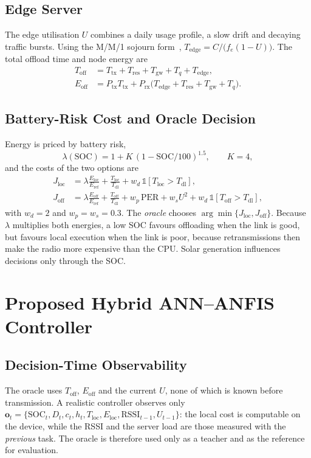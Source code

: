 \documentclass[conference]{IEEEtran}
\newcommand{\Jl}{J_{\mathrm{loc}}}
\newcommand{\Jo}{J_{\mathrm{off}}}
\begin{document}
\subsection{Edge Server}
The edge utilisation $U$ combines a daily usage profile, a slow drift and decaying traffic bursts. Using the M/M/1 sojourn
form~\cite{kleinrock1975queueing}, $T_{\mathrm{edge}} = C/\big(f_e(1-U)\big)$. The total offload time and node energy are
\begin{align}
T_{\mathrm{off}} &= T_{\mathrm{tx}} + T_{\mathrm{res}} + T_{\mathrm{gw}} + T_{q} + T_{\mathrm{edge}},\\
E_{\mathrm{off}} &= P_{\mathrm{tx}}T_{\mathrm{tx}} + P_{\mathrm{rx}}\big(T_{\mathrm{edge}}+T_{\mathrm{res}}+T_{\mathrm{gw}}+T_{q}\big).
\end{align}

\subsection{Battery-Risk Cost and Oracle Decision}
Energy is priced by battery risk,
\begin{equation}
\lambda(\mathrm{SOC}) = 1 + K\,(1-\mathrm{SOC}/100)^{1.5},\qquad K=4,
\end{equation}
and the costs of the two options are
\begin{align}
\Jl &= \lambda\frac{E_{\mathrm{loc}}}{E_{\mathrm{ref}}} + \frac{T_{\mathrm{loc}}}{T_{\mathrm{dl}}} + w_d\,\mathbb{1}[T_{\mathrm{loc}}>T_{\mathrm{dl}}],\\
\Jo &= \lambda\frac{E_{\mathrm{off}}}{E_{\mathrm{ref}}} + \frac{T_{\mathrm{off}}}{T_{\mathrm{dl}}} + w_p\,\mathrm{PER} + w_s U^2 + w_d\,\mathbb{1}[T_{\mathrm{off}}>T_{\mathrm{dl}}],
\end{align}
with $w_d=2$ and $w_p=w_s=0.3$. The \emph{oracle} chooses $\arg\min\{\Jl,\Jo\}$. Because $\lambda$ multiplies both energies, a low SOC
favours offloading when the link is good, but favours local execution when the link is poor, because retransmissions then make the
radio more expensive than the CPU. Solar generation influences decisions only through the SOC.

\section{Proposed Hybrid ANN--ANFIS Controller}
\subsection{Decision-Time Observability}
The oracle uses $T_{\mathrm{off}}$, $E_{\mathrm{off}}$ and the current $U$, none of which is known before transmission. A realistic
controller observes only
$\mathbf{o}_t=\{\mathrm{SOC}_t, D_t, c_t, h_t, T_{\mathrm{loc}}, E_{\mathrm{loc}}, \mathrm{RSSI}_{t-1}, U_{t-1}\}$:
the local cost is computable on the device, while the RSSI and the server load are those measured with the \emph{previous} task.
The oracle is therefore used only as a teacher and as the reference for evaluation.
\end{document}
